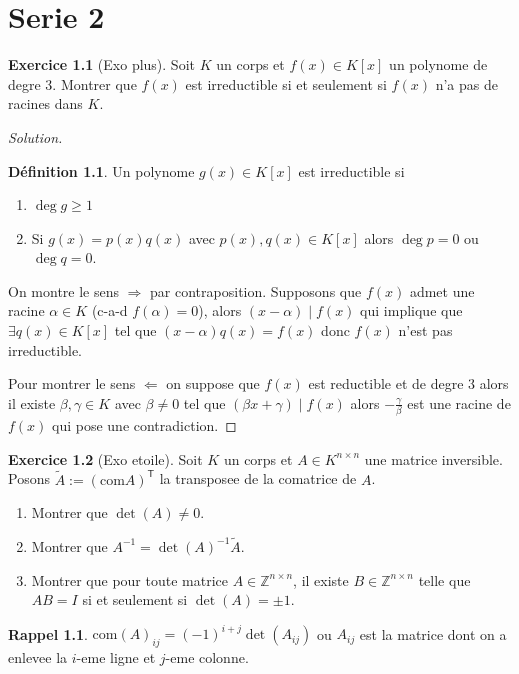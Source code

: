 \documentclass[a4paper,12pt,french]{report}
\theoremstyle{plain}
\theoremstyle{definition}
\newtheorem{definition}{Définition}[chapter]
\newtheorem*{reminder}{Rappel}
\newtheorem{exercise}{Exercice}[chapter]
\begin{document}
\chapter{Serie 2}
\begin{exercise}[Exo plus]
Soit $K$ un corps et $f(x)\in K[x]$ un polynome de degre 3. Montrer que $f(x)$ est irreductible si et seulement si $f(x)$ n'a pas de racines dans $K$.
\end{exercise}
\begin{proof}[Solution]
\begin{definition}
Un polynome $g(x)\in K[x]$ est irreductible si
\begin{enumerate}
\item $\deg g\ge 1$
\item Si $g(x)=p(x)q(x)$ avec $p(x),q(x)\in K[x]$ alors $\deg p=0$ ou $\deg q=0$.
\end{enumerate}
\end{definition}
On montre le sens $\Rightarrow$ par contraposition. Supposons que $f(x)$ admet une racine $\alpha \in K$ (c-a-d $f(\alpha)=0$), alors $(x-\alpha)\mid f(x)$ qui implique que $\exists q(x)\in K[x]$ tel que $(x-\alpha)q(x)=f(x)$ donc $f(x)$ n'est pas irreductible.

Pour montrer le sens $\Leftarrow$ on suppose que $f(x)$ est reductible et de degre 3 alors il existe $\beta,\gamma \in K$ avec $\beta\neq 0$ tel que $(\beta x+\gamma)\mid f(x)$ alors $-\frac{\gamma}{\beta}$ est une racine de $f(x)$ qui pose une contradiction.
\end{proof}
\begin{exercise}[Exo etoile]
Soit $K$ un corps et $A\in K^{n\times n}$ une matrice inversible. Posons $\tilde{A}:=(\mathrm{com}A)^{\mathsf{T}}$ la transposee de la comatrice de $A$.
\begin{enumerate}
\item Montrer que $\det(A)\neq 0$.
\item Montrer que $A^{-1}=\det(A)^{-1}\tilde{A}$.
\item Montrer que pour toute matrice $A\in \mathbb{Z}^{n\times n}$, il existe $B\in \mathbb{Z}^{n\times n}$ telle que $AB=I$ si et seulement si $\det(A)=\pm1$.
\end{enumerate}
\begin{reminder}
$\mathrm{com}(A)_{ij}=(-1)^{i+j}\det(A_{ij})$ ou $A_{ij}$ est la matrice dont on a enlevee la $i$-eme ligne et $j$-eme colonne.
\end{reminder}
\end{exercise}
\end{document}
